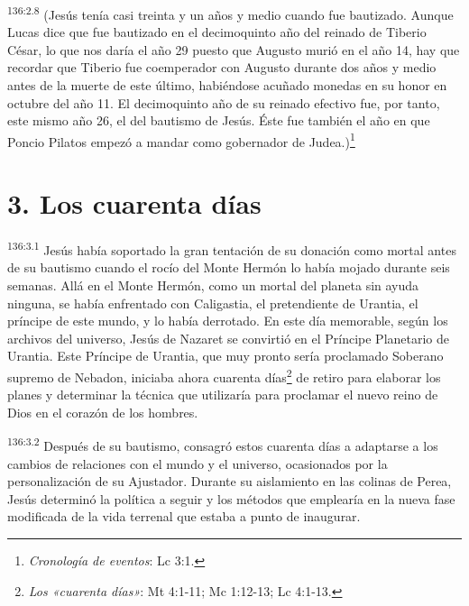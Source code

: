 \par
\textsuperscript{136:2.8} (Jesús tenía casi treinta y un años y medio cuando fue bautizado. Aunque Lucas dice que fue bautizado en el decimoquinto año del reinado de Tiberio César, lo que nos daría el año 29 puesto que Augusto murió en el año 14, hay que recordar que Tiberio fue coemperador con Augusto durante dos años y medio antes de la muerte de este último, habiéndose acuñado monedas en su honor en octubre del año 11. El decimoquinto año de su reinado efectivo fue, por tanto, este mismo año 26, el del bautismo de Jesús. Éste fue también el año en que Poncio Pilatos empezó a mandar como gobernador de Judea.)\footnote{\textit{Cronología de eventos}: Lc 3:1.}

\section*{3. Los cuarenta días}
\par
\textsuperscript{136:3.1} Jesús había soportado la gran tentación de su donación como mortal antes de su bautismo cuando el rocío del Monte Hermón lo había mojado durante seis semanas. Allá en el Monte Hermón, como un mortal del planeta sin ayuda ninguna, se había enfrentado con Caligastia, el pretendiente de Urantia, el príncipe de este mundo, y lo había derrotado. En este día memorable, según los archivos del universo, Jesús de Nazaret se convirtió en el Príncipe Planetario de Urantia. Este Príncipe de Urantia, que muy pronto sería proclamado Soberano supremo de Nebadon, iniciaba ahora cuarenta días\footnote{\textit{Los «cuarenta días»}: Mt 4:1-11; Mc 1:12-13; Lc 4:1-13.} de retiro para elaborar los planes y determinar la técnica que utilizaría para proclamar el nuevo reino de Dios en el corazón de los hombres.

\par
\textsuperscript{136:3.2} Después de su bautismo, consagró estos cuarenta días a adaptarse a los cambios de relaciones con el mundo y el universo, ocasionados por la personalización de su Ajustador. Durante su aislamiento en las colinas de Perea, Jesús determinó la política a seguir y los métodos que emplearía en la nueva fase modificada de la vida terrenal que estaba a punto de inaugurar.

